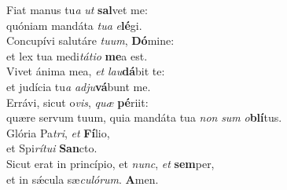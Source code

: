\oddverse Fiat manus tu\textit{a} \textit{ut} \textbf{sal}vet me:~\*\\
\oddverse quóniam mandáta \textit{tu}\textit{a} \textit{e}\textbf{lé}gi.\\
\evenverse Concupívi salutáre \textit{tu}\textit{um}, \textbf{Dó}mine:~\*\\
\evenverse et lex tua medi\textit{tá}\textit{ti}\textit{o} \textbf{me}a est.\\
\oddverse Vivet ánima mea, \textit{et} \textit{lau}\textbf{dá}bit te:~\*\\
\oddverse et judícia tu\textit{a} \textit{ad}\textit{ju}\textbf{vá}bunt me.\\
\evenverse Errávi, sicut o\textit{vis}, \textit{quæ} \textbf{pé}riit:~\*\\
\evenverse quære servum tuum, quia mandáta tua \textit{non} \textit{sum} \textit{o}\textbf{blí}tus.\\
\oddverse Glória Pa\textit{tri}, \textit{et} \textbf{Fí}lio,~\*\\
\oddverse et Spi\textit{rí}\textit{tu}\textit{i} \textbf{San}cto.\\
\evenverse Sicut erat in princípio, et \textit{nunc}, \textit{et} \textbf{sem}per,~\*\\
\evenverse et in sǽcula sæ\textit{cu}\textit{ló}\textit{rum}. \textbf{A}men.\\
